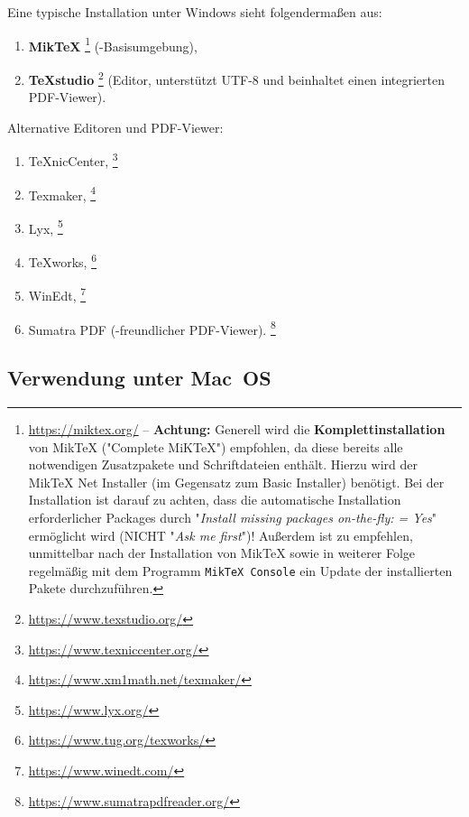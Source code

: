 Eine typische Installation unter Windows sieht folgendermaßen aus:
%
\begin{enumerate}
\item \textbf{MikTeX}%
	\footnote{\url{https://miktex.org/} -- \textbf{Achtung:}
	Generell wird die \textbf{Komplettinstallation} von MikTeX ("Complete
	MiKTeX") empfohlen, da diese bereits alle notwendigen Zusatzpakete und
	Schriftdateien enthält. Hierzu wird der MikTeX Net Installer (im Gegensatz
	zum Basic Installer) benötigt. Bei der Installation ist darauf zu achten,
	dass die automatische Installation erforderlicher Packages durch
	"\emph{Install missing packages on-the-fly: = Yes}" ermöglicht wird
	(NICHT "\emph{Ask me first}")! Außerdem ist zu empfehlen, unmittelbar
	nach der Installation von MikTeX sowie in weiterer Folge regelmäßig
	mit dem Programm \texttt{MikTeX Console} ein Update der installierten
	Pakete durchzuführen.} (\latex-Basisumgebung),
\item \textbf{TeXstudio}%
	\footnote{\url{https://www.texstudio.org/}}
	(Editor, unterstützt UTF-8 und beinhaltet einen integrierten PDF-Viewer).
\end{enumerate}
%
Alternative Editoren und PDF-Viewer:
%
\begin{enumerate}
	\item TeXnicCenter,%
	\footnote{\url{https://www.texniccenter.org/}}
	\item Texmaker,%
	\footnote{\url{https://www.xm1math.net/texmaker/}}
	\item Lyx,%
	\footnote{\url{https://www.lyx.org/}}
	\item TeXworks,%
	\footnote{\url{https://www.tug.org/texworks/}}
	\item WinEdt,%
	\footnote{\url{https://www.winedt.com/}}
	\item Sumatra PDF (\latex-freundlicher PDF-Viewer).%
	\footnote{\url{https://www.sumatrapdfreader.org/}}
\end{enumerate}

\subsection{Verwendung unter Mac~OS}

